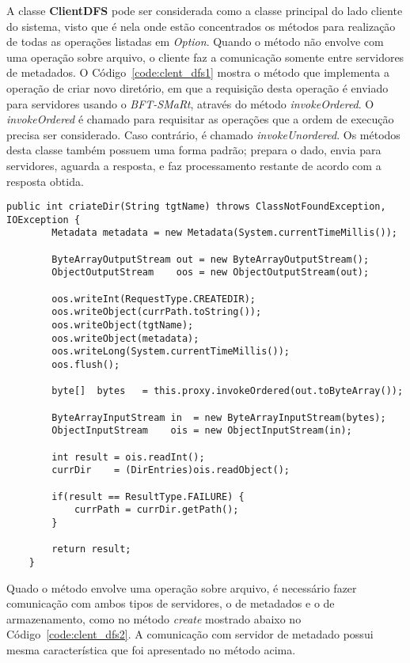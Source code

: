 A classe \textbf{ClientDFS} pode ser considerada como a classe principal do lado cliente do sistema, visto que é nela onde estão concentrados os métodos para realização de todas as operações listadas em \textit{Option}.
Quando o método não envolve com uma operação sobre arquivo, o cliente faz a comunicação somente entre servidores de metadados.
O Código~\ref{code:clent_dfs1} mostra o método que implementa a operação de criar novo diretório, em que a requisição desta operação é enviado para servidores usando o \textit{BFT-SMaRt}, através do método \textit{invokeOrdered}.
O \textit{invokeOrdered} é chamado para requisitar as operações que a ordem de execução precisa ser considerado. Caso contrário, é chamado  \textit{invokeUnordered}.
Os métodos desta classe também possuem uma forma padrão; prepara o dado, envia para servidores, aguarda a resposta, e faz processamento restante de acordo com a resposta obtida.  
\begin{lstlisting}[basicstyle=\ttfamily\footnotesize, frame=single, caption=Exemplo de método da classe ClientDFS, label=code:clent_dfs1]	
	public int criateDir(String tgtName) throws ClassNotFoundException, IOException {
		Metadata metadata = new Metadata(System.currentTimeMillis());
		
		ByteArrayOutputStream out = new ByteArrayOutputStream();
		ObjectOutputStream    oos = new ObjectOutputStream(out);
		
		oos.writeInt(RequestType.CREATEDIR);
		oos.writeObject(currPath.toString());
		oos.writeObject(tgtName);
		oos.writeObject(metadata);
		oos.writeLong(System.currentTimeMillis());
		oos.flush();
		
		byte[]  bytes   = this.proxy.invokeOrdered(out.toByteArray());
		
		ByteArrayInputStream in  = new ByteArrayInputStream(bytes);
		ObjectInputStream    ois = new ObjectInputStream(in);
		
		int result = ois.readInt();
		currDir    = (DirEntries)ois.readObject();
		
		if(result == ResultType.FAILURE) {
			currPath = currDir.getPath();
		}
		
		return result;
	}
\end{lstlisting}
Quado o método envolve uma operação sobre arquivo, é necessário fazer comunicação com ambos tipos de servidores, o de metadados e o de armazenamento, como no método \textit{create} mostrado abaixo no Código~\ref{code:clent_dfs2}.
A comunicação com servidor de metadado possui mesma característica que foi apresentado no método acima.
